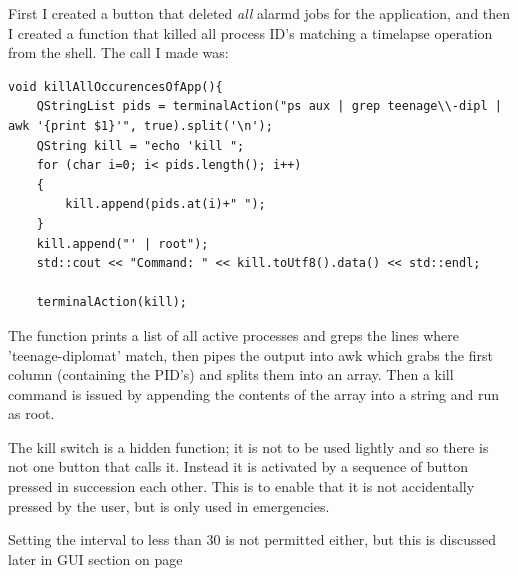 \documentclass[11pt]{article} %
\begin{document}
First I created a button that deleted {\it all} alarmd jobs for the application, and then I created a function that killed all process ID's matching a timelapse operation from the shell. The call I made was:\\
\vspace{-20pt}
\begin{lstlisting}[title=Kill Function]
void killAllOccurencesOfApp(){
    QStringList pids = terminalAction("ps aux | grep teenage\\-dipl | awk '{print $1}'", true).split('\n');
    QString kill = "echo 'kill ";
    for (char i=0; i< pids.length(); i++)
    {
        kill.append(pids.at(i)+" ");
    }
    kill.append("' | root");
    std::cout << "Command: " << kill.toUtf8().data() << std::endl;

    terminalAction(kill);
\end{lstlisting}
The function prints a list of all active processes and greps the lines where 'teenage-diplomat' match, then pipes the output into awk which grabs the first column (containing the PID's) and splits them into an array. Then a kill command is issued by appending the contents of the array into a string and run as root.

The kill switch is a hidden function; it is not to be used lightly and so there is not one button that calls it. Instead it is activated by a sequence of button pressed in succession each other. This is to enable that it is not accidentally pressed by the user, but is only used in emergencies.

Setting the interval to less than 30 is not permitted either, but this is discussed later in GUI section on page~\pageref{gui}
\end{document}
